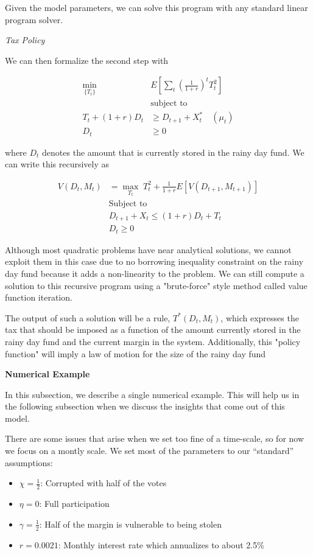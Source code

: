 Given the model parameters, we can solve this program with any standard linear program solver.

\textit{Tax Policy}

We can then formalize the second step with

\begin{align*}
  \min_{\{T_t\}} \; & E \left[ \sum_{t} \left( \frac{1}{1 + r} \right)^t T_t^2 \right] \\
  &\text{subject to} \\
  T_t + (1 + r) D_t &\geq D_{t+1} + X^*_t \quad (\mu_t) \\
  D_t &\geq 0
\end{align*}

where $D_t$ denotes the amount that is currently stored in the rainy day fund. We can write this
recursively as

\begin{align*}
  V(D_t, M_t) &= \max_{T_t} \; T_t^2 + \frac{1}{1 + r} E [V(D_{t+1}, M_{t+1})] \\
  &\text{Subject to} \\
  &D_{t+1} + X_{t} \leq (1 + r) D_t + T_t \\
  &D_t \geq 0
\end{align*}

Although most quadratic problems have near analytical solutions, we cannot exploit them in this case
due to no borrowing inequality constraint on the rainy day fund because it adds a non-linearity to
the problem. We can still compute a solution to this recursive program using a "brute-force" style
method called value function iteration.

The output of such a solution will be a rule, $T^*(D_t, M_t)$, which expresses the tax that should
be imposed as a function of the amount currently stored in the rainy day fund and the current margin
in the system. Additionally, this "policy function" will imply a law of motion for the size of the
rainy day fund

\textbf{Numerical Example}

In this subsection, we describe a single numerical example. This will help us in the following
subsection when we discuss the insights that come out of this model.

There are some issues that arise when we set too fine of a time-scale, so for now we focus on a
montly scale. We set most of the parameters to our ``standard'' assumptions:

\begin{itemize}
  \item $\chi = \frac{1}{2}$: Corrupted with half of the votes
  \item $\eta = 0$: Full participation
  \item $\gamma = \frac{1}{2}$: Half of the margin is vulnerable to being stolen
  \item $r = 0.0021$: Monthly interest rate which annualizes to about 2.5\%
\end{itemize}

